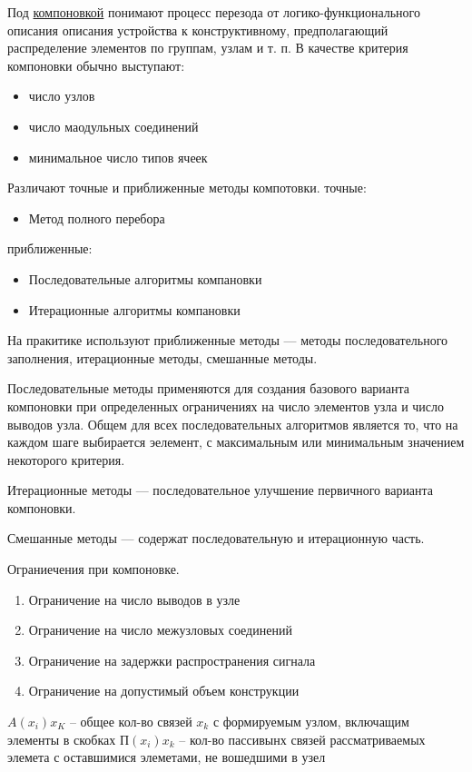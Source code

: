 \documentclass{article}
\begin{document}
	Под \underline{компоновкой} понимают процесс перезода от логико-функционального описания описания устройства к конструктивному, предполагающий распределение элементов по группам, узлам и т. п.
	В качестве критерия компоновки обычно выступают:
	\begin{itemize}
		\item число узлов
		\item число маодульных соединений
		\item минимальное число типов ячеек
	\end{itemize}
	Различают точные и приближенные методы компотовки.
	точные:
	\begin{itemize}
		\item Метод полного перебора
	\end{itemize}
	приближенные:
	\begin{itemize}
		\item Последовательные алгоритмы компановки
		\item Итерационные алгоритмы компановки
	\end{itemize}
	На пракитике используют приближенные методы --- методы последовательного заполнения, итерационные методы, смешанные методы.

	Последовательные методы применяются для создания базового варианта компоновки при определенных ограничениях на число элементов узла и число выводов узла. Общем для всех последовательных алгоритмов является то, что на каждом шаге выбирается эелемент, с максимальным или минимальным значением некоторого критерия.

	Итерационные методы --- последовательное улучшение первичного варианта компоновки.

	Смешанные методы --- содержат последовательную и итерационную часть.

	Ограниечения при компоновке.

	\begin{enumerate}
		\item Ограничение на число выводов в узле
		\item Ограничение на число межузловых соединений
		\item Ограничение на задержки распространения сигнала
		\item Ограничение на допустимый объем конструкции
	\end{enumerate}

	$A (x_i) x_K$ -- общее кол-во связей $x_k$ с формируемым узлом, включащим элементы в скобках
	$П (x_i) x_k$ -- кол-во пассивынх связей рассматриваемых элемета с оставшимися элеметами, не вошедшими в узел
\end{document}
